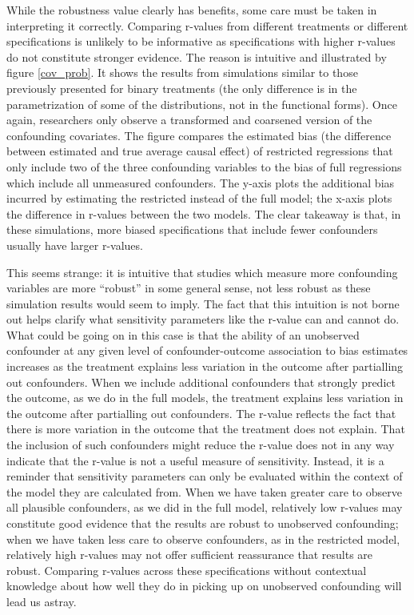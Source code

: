 \documentclass[hidelinks,11pt]{article}
\begin{document}
While the robustness value clearly has benefits, some care must be taken in interpreting it correctly. Comparing r-values from different treatments or different specifications is unlikely to be informative as specifications with higher r-values do not constitute stronger evidence. The reason is intuitive and illustrated by figure \ref{cov_prob}. It shows the results from simulations similar to those previously presented for binary treatments (the only difference is in the parametrization of some of the distributions, not in the functional forms). Once again, researchers only observe a transformed and coarsened version of the confounding covariates. The figure compares the estimated bias (the difference between estimated and true average causal effect) of restricted regressions that only include two of the three confounding variables to the bias of full regressions which include all unmeasured confounders. The y-axis plots the additional bias incurred by estimating the restricted instead of the full model; the x-axis plots the difference in  r-values between the two models. The clear takeaway is that, in these simulations, more biased specifications that include fewer confounders usually have larger r-values.

This seems strange: it is intuitive that studies which measure more confounding variables are more ``robust'' in some general sense, not less robust as these simulation results would seem to imply. The fact that this intuition is not borne out helps clarify what sensitivity parameters like the r-value can and cannot do. What could be going on in this case is that the ability of an unobserved confounder at any given level of confounder-outcome association to bias estimates increases as the treatment explains less variation in the outcome after partialling out confounders. When we include additional confounders that strongly predict the outcome, as we do in the full models, the treatment explains less variation in the outcome after partialling out confounders. The r-value reflects the fact that there is more variation in the outcome that the treatment does not explain. That the inclusion of such confounders might reduce the r-value does not in any way indicate that the r-value is not a useful measure of sensitivity. Instead, it is a reminder that sensitivity parameters can only be evaluated within the context of the model they are calculated from. When we have taken greater care to observe all plausible confounders, as we did in the full model, relatively low r-values may constitute good evidence that the results are robust to unobserved confounding; when we have taken less care to observe confounders, as in the restricted model, relatively high r-values may not offer sufficient reassurance that results are robust. Comparing r-values across these specifications without contextual knowledge about how well they do in picking up on unobserved confounding will lead us astray.
\end{document}
